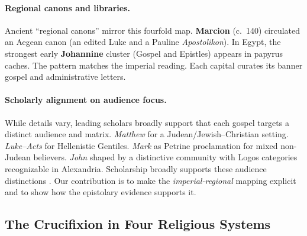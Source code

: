 \paragraph{Regional canons and libraries.}
Ancient “regional canons” mirror this fourfold map.
\textbf{Marcion} (c.~140) circulated an Aegean canon (an edited Luke and a Pauline \textit{Apostolikon}).
In Egypt, the strongest early \textbf{Johannine} cluster (Gospel and Epistles) appears in papyrus caches.
The pattern matches the imperial reading.
Each capital curates its banner gospel and administrative letters.

\paragraph{Scholarly alignment on audience focus.}
While details vary, leading scholars broadly support that each gospel targets a distinct audience and matrix.
\textit{Matthew} for a Judean/Jewish--Christian setting.
\textit{Luke--Acts} for Hellenistic Gentiles.
\textit{Mark} as Petrine proclamation for mixed non-Judean believers.
\textit{John} shaped by a distinctive community with Logos categories recognizable in Alexandria.
Scholarship broadly supports these audience distinctions \cite{bauckham:eyewitnesses,hengel:fourgospels,brown:johannine,johnson:writings,meeks:urban,hurtado:lordjc}.
Our contribution is to make the \emph{imperial-regional} mapping explicit and to show how the epistolary evidence supports it.

\subsection{The Crucifixion in Four Religious Systems}

